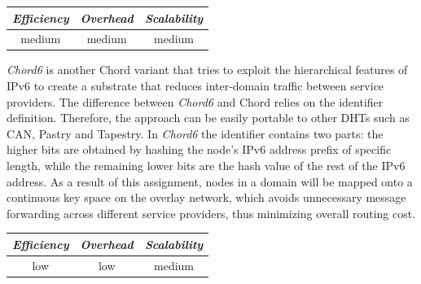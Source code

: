 \begin{center}
\begin{tabular}{ccc}
\emph{Efficiency} & \emph{Overhead} & \emph{Scalability} \\
\hline
medium &
medium &
medium
\end{tabular}
\end{center}

\emph{Chord6} \cite{XZHL2005} is another Chord variant that tries to
exploit the hierarchical features of IPv6 to create a substrate that
reduces inter-domain traffic between service providers. The difference between
\emph{Chord6} and Chord relies on the identifier definition. Therefore, the approach
can be easily portable to other DHTs such as CAN, Pastry and Tapestry. In \emph{Chord6}
the identifier contains two parts: the higher bits are obtained by hashing the
node's IPv6 address prefix of specific length, while the remaining lower bits
are the hash value of the rest of the IPv6 address. As a result of this
assignment, nodes in a domain will be mapped onto a continuous key space on the
overlay network, which avoids unnecessary message forwarding across different
service providers, thus minimizing overall routing cost.

\begin{center}
\begin{tabular}{ccc}
\emph{Efficiency} & \emph{Overhead} & \emph{Scalability} \\
\hline
low &
low &
medium
\end{tabular}
\end{center}

